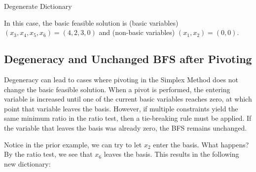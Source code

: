\begin{remark}{Degenerate Dictionary}{}
\end{remark}

In this case, the basic feasible solution is (basic variables) $(x_3,x_4, x_5,x_6) = (4,2,3,0)$ and (non-basic variables) $(x_1, x_2) = (0,0)$.

\subsection{Degeneracy and Unchanged BFS after Pivoting}
Degeneracy can lead to cases where pivoting in the Simplex Method does not change the basic feasible solution. When a pivot is performed, the entering variable is increased until one of the current basic variables reaches zero, at which point that variable leaves the basis. However, if multiple constraints yield the same minimum ratio in the ratio test, then a tie-breaking rule must be applied. If the variable that leaves the basis was already zero, the BFS remains unchanged. 

Notice in the prior example, we can try to let $x_2$ enter the basis.  What happens?  By the ratio test, we see that $x_6$ leaves the basis.  This results in the following new dictionary:

